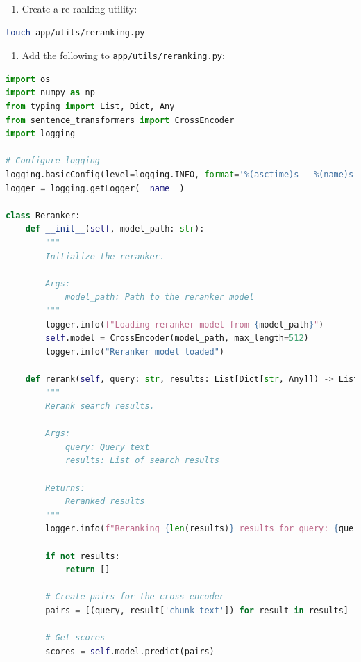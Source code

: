 \documentclass[
  screen,review,acmlarge]{acmart}
\newcommand{\passthrough}[1]{#1}
\providecommand{\tightlist}{%
  \setlength{\itemsep}{0pt}\setlength{\parskip}{0pt}}
\begin{document}
\begin{enumerate}
\def\labelenumi{\arabic{enumi}.}
\setcounter{enumi}{2}
\tightlist
\item
  Create a re-ranking utility:
\end{enumerate}

\begin{lstlisting}[language=bash]
touch app/utils/reranking.py
\end{lstlisting}

\begin{enumerate}
\def\labelenumi{\arabic{enumi}.}
\setcounter{enumi}{3}
\tightlist
\item
  Add the following to \passthrough{\lstinline!app/utils/reranking.py!}:
\end{enumerate}

\begin{lstlisting}[language=Python]
import os
import numpy as np
from typing import List, Dict, Any
from sentence_transformers import CrossEncoder
import logging

# Configure logging
logging.basicConfig(level=logging.INFO, format='%(asctime)s - %(name)s - %(levelname)s - %(message)s')
logger = logging.getLogger(__name__)

class Reranker:
    def __init__(self, model_path: str):
        """
        Initialize the reranker.
        
        Args:
            model_path: Path to the reranker model
        """
        logger.info(f"Loading reranker model from {model_path}")
        self.model = CrossEncoder(model_path, max_length=512)
        logger.info("Reranker model loaded")
    
    def rerank(self, query: str, results: List[Dict[str, Any]]) -> List[Dict[str, Any]]:
        """
        Rerank search results.
        
        Args:
            query: Query text
            results: List of search results
            
        Returns:
            Reranked results
        """
        logger.info(f"Reranking {len(results)} results for query: {query}")
        
        if not results:
            return []
        
        # Create pairs for the cross-encoder
        pairs = [(query, result['chunk_text']) for result in results]
        
        # Get scores
        scores = self.model.predict(pairs)
        

\end{lstlisting}
\end{document}

